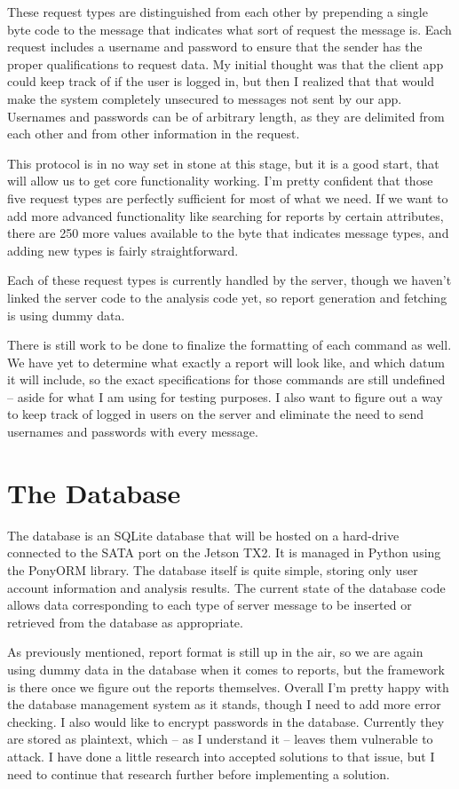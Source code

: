 \documentclass[onecolumn, draftclsnofoot,10pt, compsoc]{IEEEtran}
\begin{document}
These request types are distinguished from each other by prepending a single byte code to the message that indicates what sort of request the message is.
Each request includes a username and password to ensure that the sender has the proper qualifications to request data.
My initial thought was that the client app could keep track of if the user is logged in, but then I realized that that would make the system completely unsecured to messages not sent by our app.
Usernames and passwords can be of arbitrary length, as they are delimited from each other and from other information in the request.

This protocol is in no way set in stone at this stage, but it is a good start, that will allow us to get core functionality working.
I'm pretty confident that those five request types are perfectly sufficient for most of what we need.
If we want to add more advanced functionality like searching for reports by certain attributes, there are 250 more values available to the byte that indicates message types, and adding new types is fairly straightforward.

Each of these request types is currently handled by the server, though we haven't linked the server code to the analysis code yet, so report generation and fetching is using dummy data.

There is still work to be done to finalize the formatting of each command as well.
We have yet to determine what exactly a report will look like, and which datum it will include, so the exact specifications for those commands are still undefined -- aside for what I am using for testing purposes.
I also want to figure out a way to keep track of logged in users on the server and eliminate the need to send usernames and passwords with every message.

\section{The Database}
The database is an SQLite database that will be hosted on a hard-drive connected to the SATA port on the Jetson TX2.
It is managed in Python using the PonyORM library.
The database itself is quite simple, storing only user account information and analysis results.
The current state of the database code allows data corresponding to each type of server message to be inserted or retrieved from the database as appropriate.

As previously mentioned, report format is still up in the air, so we are again using dummy data in the database when it comes to reports, but the framework is there once we figure out the reports themselves.
Overall I'm pretty happy with the database management system as it stands, though I need to add more error checking.
I also would like to encrypt passwords in the database.
Currently they are stored as plaintext, which -- as I understand it -- leaves them vulnerable to attack.
I have done a little research into accepted solutions to that issue, but I need to continue that research further before implementing a solution.
\end{document}
